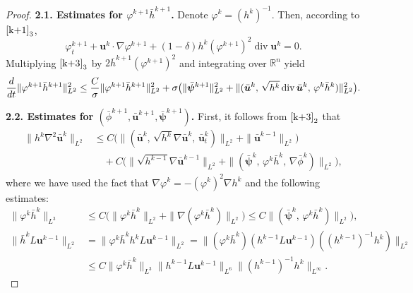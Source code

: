 \documentclass[10pt,a4paper]{amsart}
\DeclareMathOperator{\diver}{\mathrm{div}}
\begin{document}
\begin{proof}
\textbf{2.1. Estimates for $\varphi^{k+1}\bar{h}^{k+1}$.} Denote $\varphi^{k}=(h^{k})^{-1}$. Then, according to $\eqref{k+1}_3$, 
\begin{equation*}
\varphi^{k+1}_t+\boldsymbol{u}^k\cdot \nabla \varphi^{k+1}+(1-\delta)h^k (\varphi^{k+1})^2\diver\boldsymbol{u}^k=0.
\end{equation*}
Multiplying $\eqref{k+3}_3$ by $2\overline{h}^{k+1}(\varphi^{k+1})^2$ and integrating over $\mathbb{R}^n$ yield
\begin{equation}\label{go64aah}
\frac{\rm d}{{\rm d}t}\|\varphi^{k+1}\bar{h}^{k+1}\|^2_{L^2}\\ 
\leq \frac{C}{\sigma}\|\varphi^{k+1}\bar{h}^{k+1}\|^2_{L^2} + \sigma \big(\|\bar{\boldsymbol{\psi}}^{k+1}\|^2_{L^2}
+ \|(\bar{\boldsymbol{u}}^k,\, \sqrt{h^k}\diver\bar{\boldsymbol{u}}^k,\,\varphi^k\bar{h}^k)\|_{L^2}^2\big).
\end{equation}


\textbf{2.2. Estimates for $(\bar{\phi}^{k+1},\bar{\boldsymbol{u}}^{k+1},\bar{\boldsymbol{\psi}}^{k+1})$.} First, it follows from $\eqref{k+3}_2$ that
\begin{equation}\label{hubarr}
\begin{aligned}
\|h^k\nabla^2\bar{\boldsymbol{u}}^k\|_{L^2}& \leq C\big(\|(\bar{\boldsymbol{u}}^k,\,\sqrt{h^k}\nabla \bar{\boldsymbol{u}}^k,\,\bar{\boldsymbol{u}}^k_t)\|_{L^2}+\|\bar{\boldsymbol{u}}^{k-1}\|_{L^2}\big)\\
&\quad +C\big(\|\sqrt{h^{k-1}}\nabla\bar{\boldsymbol{u}}^{k-1}\|_{L^2}+\|(\bar{\boldsymbol{\psi}}^{k},\,\varphi^{k}\bar{h}^{k},\,\nabla \bar{\phi}^{k})\|_{L^2}\big),
\end{aligned}
\end{equation}
where we have used the fact that $\nabla \varphi^k=-(\varphi^k)^2\nabla h^k$ and the following estimates:
\begin{equation}\label{2Dxinfaxian}
\begin{aligned}
\|\varphi^k\bar{h}^{k}\|_{L^3}
&\leq C\big(\|\varphi^k\bar{h}^{k}\|_{L^2}+\|\nabla(\varphi^k\bar{h}^{k})\|_{L^2}\big)\leq C\|(\bar{\boldsymbol{\psi}}^{k},\,\varphi^{k}\bar{h}^{k})\|_{L^2}\big),\\
\|\bar{h}^{k}L\boldsymbol{u}^{k-1}\|_{L^2}&=\|\varphi^k\bar{h}^{k} h^k L\boldsymbol{u}^{k-1}\|_{L^2}=\|(\varphi^k\bar{h}^{k}) (h^{k-1} L\boldsymbol{u}^{k-1})((h^{k-1})^{-1}h^k)\|_{L^2}\\
& \leq C\|\varphi^k\bar{h}^{k}\|_{L^3}\|h^{k-1} L\boldsymbol{u}^{k-1}\|_{L^6}\|(h^{k-1})^{-1}h^k\|_{L^\infty}.
\end{aligned}
\end{equation}



\end{proof}
\end{document}
